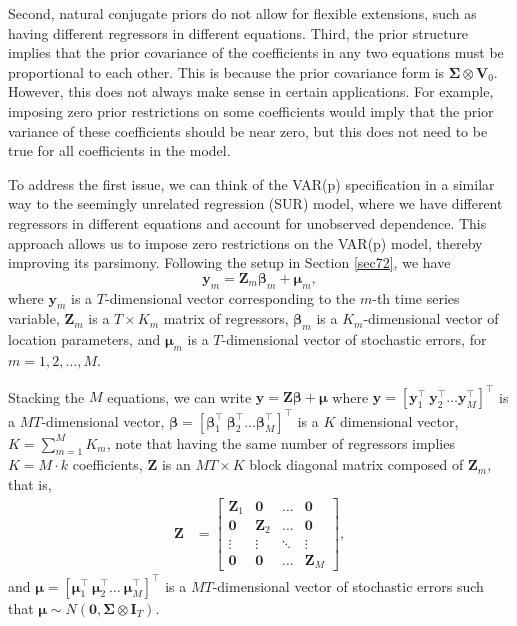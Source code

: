 Second, natural conjugate priors do not allow for flexible extensions, such as having different regressors in different equations. Third, the prior structure implies that the prior covariance of the coefficients in any two equations must be proportional to each other. This is because the prior covariance form is $\bm{\Sigma} \otimes \bm{V}_0$. However, this does not always make sense in certain applications. For example, imposing zero prior restrictions on some coefficients would imply that the prior variance of these coefficients should be near zero, but this does not need to be true for all coefficients in the model.

To address the first issue, we can think of the VAR(p) specification in a similar way to the seemingly unrelated regression (SUR) model, where we have different regressors in different equations and account for unobserved dependence. This approach allows us to impose zero restrictions on the VAR(p) model, thereby improving its parsimony. Following the setup in Section \ref{sec72}, we have
\[
\bm{y}_{m} = \bm{Z}_{m} \bm{\beta}_m + \bm{\mu}_m,
\]
where $\bm{y}_m$ is a $T$-dimensional vector corresponding to the $m$-th time series variable, $\bm{Z}_m$ is a $T \times K_m$ matrix of regressors, $\bm{\beta}_m$ is a $K_m$-dimensional vector of location parameters, and $\bm{\mu}_m$ is a $T$-dimensional vector of stochastic errors, for $m = 1, 2, \dots, M$.

Stacking the $M$ equations, we can write $\bm{y}=\bm{Z}\bm{\beta}+\bm{\mu}$ where $\bm{y}=\left[\bm{y}_{1}^{\top} \ \bm{y}_{2}^{\top} \dots \bm{y}_{M}^{\top}\right]^{\top}$ is a $MT$-dimensional vector,  $\bm{\beta}=\left[\bm{\beta}_{1}^{\top} \ \bm{\beta}_{2}^{\top} \ldots \bm{\beta}_{M}^{\top}\right]^{\top}$ is a $ K$ dimensional vector, $K=\sum_{m=1}^{M} K_m$, note that having the same number of regressors implies $K = M \cdot k$ coefficients, $\bm{Z}$ is an $MT\times K$ block diagonal matrix composed of $\bm{Z}_{m}$, that is,
\begin{align*}
	\bm{Z}&=\begin{bmatrix}
		\bm{Z}_1 & \bm{0} & \dots & \bm{0}\\
		\bm{0} & \bm{Z}_2 & \dots & \bm{0}\\
		\vdots & \vdots & \ddots & \vdots\\
		\bm{0} & \bm{0} & \dots & \bm{Z}_M		
	\end{bmatrix},
\end{align*}
and $\bm{\mu}=\left[\bm{\mu}_{1}^{\top} \ \bm{\mu}_{2}^{\top} \dots \ \bm{\mu}_{M}^{\top}\right]^{\top}$ is a $MT$-dimensional vector of stochastic errors such that $\bm{\mu}\sim{N}(\bm{0},\bm{\Sigma}\otimes \bm{I}_T)$.

